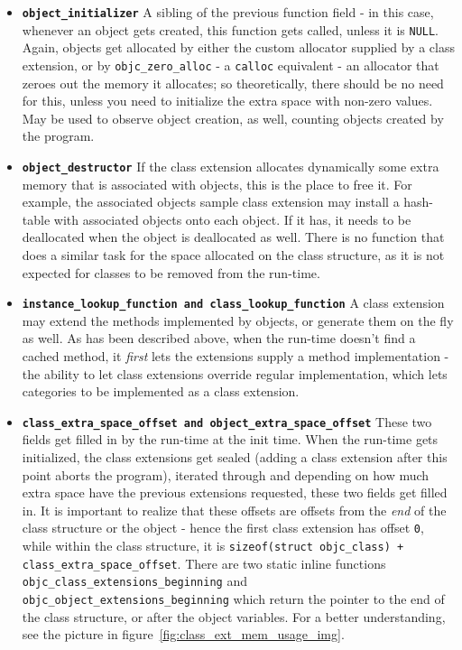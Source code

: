 \begin{itemize}
  \item{\bf{\tt{object\_initializer}}} A sibling of the previous function field - in this case, whenever an object gets created, this function gets called, unless it is \texttt{NULL}. Again, objects get allocated by either the custom allocator supplied by a class extension, or by \verb=objc_zero_alloc= - a \verb=calloc= equivalent - an allocator that zeroes out the memory it allocates; so theoretically, there should be no need for this, unless you need to initialize the extra space with non-zero values. May be used to observe object creation, as well, counting objects created by the program.
  \item{\bf{\tt{object\_destructor}}} If the class extension allocates dynamically some extra memory that is associated with objects, this is the place to free it. For example, the associated objects sample class extension may install a hash-table with associated objects onto each object. If it has, it needs to be deallocated when the object is deallocated as well.
  There is no function that does a similar task for the space allocated on the class structure, as it is not expected for classes to be removed from the run-time.
  \item{\bf{\tt{instance\_lookup\_function} and \tt{class\_lookup\_function}}} A class extension may extend the methods implemented by objects, or generate them on the fly as well. As has been described above, when the run-time doesn't find a cached method, it \emph{first} lets the extensions supply a method implementation - the ability to let class extensions override regular implementation, which lets categories to be implemented as a class extension.
  \item{\bf{\tt{class\_extra\_space\_offset} and \tt{object\_extra\_space\_offset}}} These two fields get filled in by the run-time at the init time. When the run-time gets initialized, the class extensions get sealed (adding a class extension after this point aborts the program), iterated through and depending on how much extra space have the previous extensions requested, these two fields get filled in. It is important to realize that these offsets are offsets from the \emph{end} of the class structure or the object - hence the first class extension has offset \texttt{0}, while within the class structure, it is \texttt{sizeof(struct objc\_class) + class\_extra\_space\_offset}. There are two static inline functions \texttt{objc\_class\_extensions\_beginning} \newline{}and \texttt{objc\_object\_extensions\_beginning} which return the pointer to the end of the class structure, or after the object variables. For a better understanding, see the picture in figure~\ref{fig:class_ext_mem_usage_img}.
  
\end{itemize}


